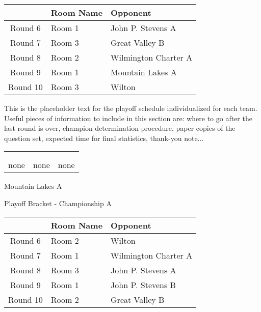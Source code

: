 \documentclass{article}%
\begin{document}
\vspace*{4pt}%
%
\begin{tabularx}{\textwidth}{|c|Y|Y|}%
\hline%
&Room Name&Opponent\\%
\hline%
Round 6&Room 1&John P. Stevens A\\%
Round 7&Room 3&Great Valley B\\%
Round 8&Room 2&Wilmington Charter A\\%
Round 9&Room 1&Mountain Lakes A\\%
Round 10&Room 3&Wilton\\%
\hline%
\end{tabularx}%
\vspace*{30pt}%
\linebreak%
This is the placeholder text for the playoff schedule individualized for each team. Useful pieces of information to include in this section are: where to go after the last round is over, champion determination procedure, paper copies of the question set, expected time for final statistics, thank{-}you note...%
\vspace*{30pt}%
\newline%
%
\begin{tabularx}{\textwidth}{YYY}%
  &  &  \\%
\\%
none&none&none\\%
\end{tabularx}%
\newpage%
\begin{center}%
\begin{Huge}%
Mountain Lakes A%
\end{Huge}%
\vspace*{12pt}%
\linebreak%
\begin{Large}%
Playoff Bracket {-} Championship A%
\end{Large}%
\end{center}%
\vspace*{4pt}%
%
\begin{tabularx}{\textwidth}{|c|Y|Y|}%
\hline%
&Room Name&Opponent\\%
\hline%
Round 6&Room 2&Wilton\\%
Round 7&Room 1&Wilmington Charter A\\%
Round 8&Room 3&John P. Stevens A\\%
Round 9&Room 1&John P. Stevens B\\%
Round 10&Room 2&Great Valley B\\%
\hline%
\end{tabularx}%
\end{document}
